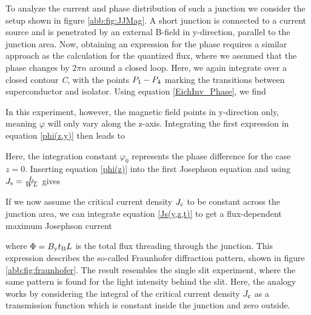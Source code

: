 To analyze the current and phase distribution of such a junction we consider the setup shown in figure \ref{abb:fig:JJMag}. A short junction is connected to a current source and is penetrated by an external B-field in y-direction, parallel to the junction area. Now, obtaining an expression for the phase requires a similar approach as the calculation for the quantized flux, where we assumed that the phase changes by $2\pi n$ around a closed loop. Here, we again integrate over a closed contour \textit{C}, with the points $P_{\rm 1}-P_{\rm 4}$ marking the transitions between superconductor and isolator. Using equation \ref{EichInv_Phase}, we find 


In this experiment, however, the magnetic field points in y-direction only, meaning $\varphi$ will only vary along the z-axis. Integrating the first expression in equation \ref{phi(z,y)} then leads to


Here, the integration constant $\varphi_0$ represents the phase difference for the case $z=0$. Inserting equation \ref{phi(z)} into the first Josephson equation and using $J_{\rm s} = \frac{I_{\rm s}}{WL}$ gives 


If we now assume the critical current density $J_{\rm c}$ to be constant across the junction area, we can integrate equation \ref{Js(y,z,t)} to get a flux-dependent maximum Josephson current


where $\Phi = B_{\rm y}t_{\rm B}L$ is the total flux threading through the junction. This expression describes the so-called Fraunhofer diffraction pattern, shown in figure \ref{abb:fig:fraunhofer}. The result resembles the single slit experiment, where the same pattern is found for the light intensity behind the slit. Here, the analogy works by considering the integral of the critical current density $J_{\rm c}$ as a transmission function which is constant inside the junction and zero outside. 

